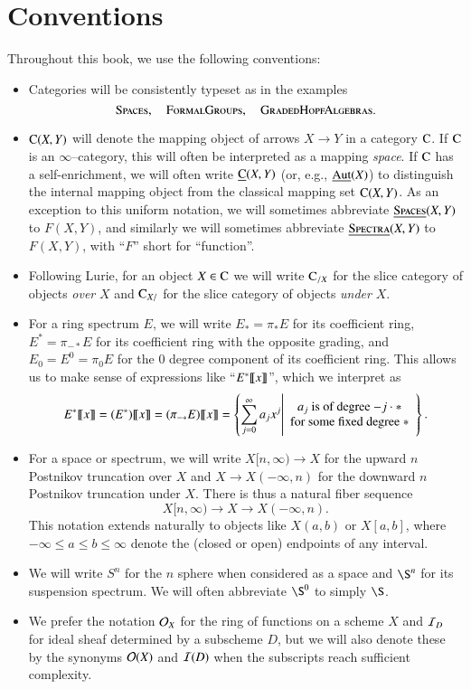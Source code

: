 
\section{Conventions}

Throughout this book, we use the following conventions:

\begin{itemize}
\item Categories will be consistently typeset as in the examples \[\normalfont\textsc{Spaces}, \quad \normalfont\textsc{FormalGroups}, \quad \normalfont\textsc{GradedHopfAlgebras}.\]
\item $\normalfont\textsc{C}(X, Y)$ will denote the mapping object of arrows $X \to Y$ in a category $\normalfont\textsc{C}$.  If $\normalfont\textsc{C}$ is an $\infty$--category, this will often be interpreted as a mapping \emph{space}.  If $\normalfont\textsc{C}$ has a self-enrichment, we will often write $\underline{\normalfont\textsc{C}}(X, Y)$ (or, e.g., $\operatorname{\underline{\smash{\operatorname{Aut}}}}(X)$) to distinguish the internal mapping object from the classical mapping set $\normalfont\textsc{C}(X, Y)$.  As an exception to this uniform notation, we will sometimes abbreviate $\underline{\normalfont\textsc{Spaces}}(X, Y)$ to $F(X, Y)$, and similarly we will sometimes abbreviate $\underline{\normalfont\textsc{Spectra}}(X, Y)$ to $F(X, Y)$, with ``$F$'' short for ``function''.
\item Following Lurie, for an object $X \in \normalfont\textsc{C}$ we will write $\normalfont\textsc{C}_{/X}$ for the slice category of objects \emph{over} $X$ and $\normalfont\textsc{C}_{X/}$ for the slice category of objects \emph{under} $X$.
\item For a ring spectrum $E$, we will write $E_* = \pi_* E$ for its coefficient ring, $E^* = \pi_{-*} E$ for its coefficient ring with the opposite grading, and $E_0 = E^0 = \pi_0 E$ for the $0${\th} degree component of its coefficient ring.  This allows us to make sense of expressions like ``$E^*\llbracket{x}\rrbracket$'', which we interpret as \[E^*\llbracket{x}\rrbracket = (E^*)\llbracket{x}\rrbracket = (\pi_{-*} E)\llbracket{x}\rrbracket = \left\{ \sum_{j=0}^\infty a_j x^j \middle| \begin{array}{c} \text{$a_j$ is of degree $-j \cdot *$} \\ \text{for some fixed degree $*$} \end{array} \right\}.\]
\item For a space or spectrum, we will write $X[n, \infty) \to X$ for the upward $n${\th} Postnikov truncation over $X$ and $X \to X(-\infty, n)$ for the downward $n${\th} Postnikov truncation under $X$.  There is thus a natural fiber sequence \[X[n, \infty) \to X \to X(-\infty, n).\]  This notation extends naturally to objects like $X(a, b)$ or $X[a, b]$, where $-\infty \le a \le b \le \infty$ denote the (closed or open) endpoints of any interval.
\item We will write $S^n$ for the $n${\th} sphere when considered as a space and $\S^n$ for its suspension spectrum.  We will often abbreviate $\S^0$ to simply $\S$.
\item We prefer the notation $\mathcal{O}_X$ for the ring of functions on a scheme $X$ and $\mathcal{I}_D$ for ideal sheaf determined by a subscheme $D$, but we will also denote these by the synonyms $\mathcal{O}(X)$ and $\mathcal{I}(D)$ when the subscripts reach sufficient complexity.
\end{itemize}
